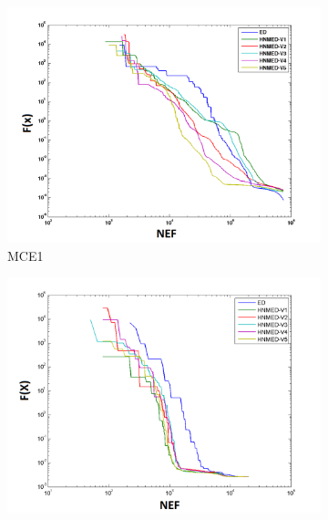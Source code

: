 \begin{table}
{\begin{tabular}{clcccccc}
			
		\end{tabular}
	}
\end{table}


\begin{figure}
	\centering
	 	\captionsetup{width=.85\linewidth}
	\begin{subfigure}[b]{0.49\linewidth}
		\includegraphics[width=\linewidth]{Figures/B-Grafica_Convergencia_Problema_1}
		\caption{MCE1} \label{fig:M1} 
	\end{subfigure}
	\begin{subfigure}[b]{0.49\linewidth}
		\includegraphics[width=\textwidth]{Figures/B-Grafica_Convergencia_Problema_2}

\end{subfigure}
\end{figure}
